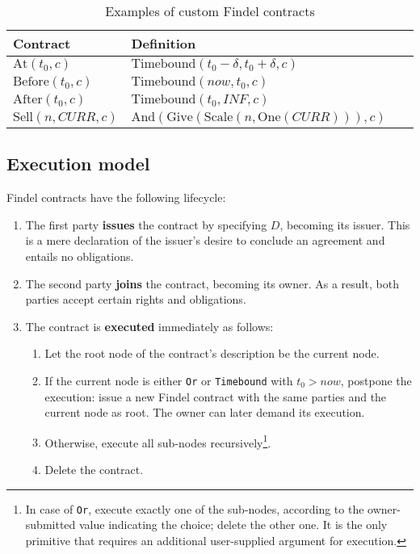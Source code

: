 \begin{table}%
	\centering
	\begin{tabular}{|p{0.25\linewidth}|p{0.75\linewidth}|}
		\hline
		\textbf{Contract} & \textbf{Definition} \\
		\hline
		\(\mathrm{At}(t_0, c)\) & \(\mathrm{Timebound}(t_0 - \delta, t_0 + \delta, c)\) \\
		\hline
		\(\mathrm{Before}(t_0, c)\) & \(\mathrm{Timebound}(now, t_0, c)\) \\
		\hline
		\(\mathrm{After}(t_0, c)\) & \(\mathrm{Timebound}(t_0, INF, c)\) \\
		\hline
		\(\mathrm{Sell}(n, CURR, c)\) & \(\mathrm{And}(\mathrm{Give}(\mathrm{Scale}(n,\mathrm{One}(CURR))),c)\) \\
		\hline
	\end{tabular}
	\caption{Examples of custom Findel contracts}
	\label{tab:Ch10FindelComposability}
\end{table}



\subsection{Execution model} \label{sec:Ch10FindelExecutionModel}

Findel contracts have the following lifecycle:

\begin{enumerate}
	\item The first party \textbf{issues} the contract by specifying $D$, becoming its issuer. This is a mere declaration of the issuer's desire to conclude an agreement and entails no obligations.
	\item The second party \textbf{joins} the contract, becoming its owner. As a result, both parties accept certain rights and obligations.
	\item The contract is \textbf{executed} immediately as follows:
	\begin{enumerate}
		\item Let the root node of the contract's description be the current node.
		\item If the current node is either \texttt{Or} or \texttt{Timebound} with $t_0 > now$, postpone the execution: issue a new Findel contract with the same parties and the current node as root. The owner can later demand its execution.
		\item Otherwise, execute all sub-nodes recursively\footnote{In case of \texttt{Or}, execute exactly one of the sub-nodes, according to the owner-submitted value indicating the choice; delete the other one. It is the only primitive that requires an additional user-supplied argument for execution.}.
		\item Delete the contract.
	\end{enumerate}
\end{enumerate}

